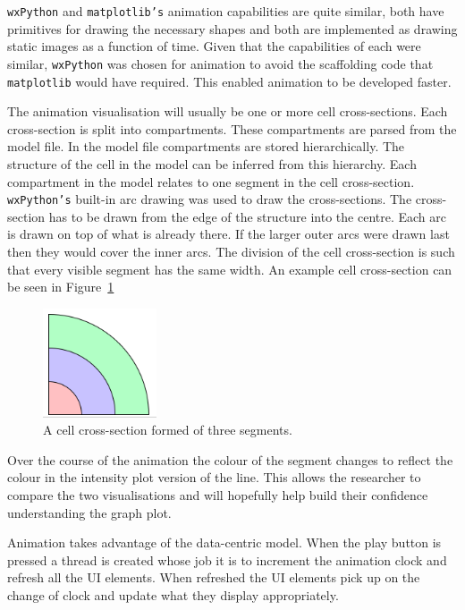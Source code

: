 \texttt{wxPython} and \texttt{matplotlib's} animation capabilities are quite similar, both have primitives for drawing the necessary shapes and both are implemented as drawing static images as a function of time.  Given that the capabilities of each were similar, \texttt{wxPython} was chosen for animation to avoid the scaffolding code that \texttt{matplotlib} would have required.  This enabled animation to be developed faster.

The animation visualisation will usually be one or more cell cross-sections.  Each cross-section is split into compartments. These compartments are parsed from the model file.  In the model file compartments are stored hierarchically.  The structure of the cell in the model can be inferred from this hierarchy.  Each compartment in the model relates to one segment in the cell cross-section.  \texttt{wxPython's} built-in arc drawing was used to draw the cross-sections.  The cross-section has to be drawn from the edge of the structure into the centre.  Each arc is drawn on top of what is already there.  If the larger outer arcs were drawn last then they would cover the inner arcs.  The division of the cell cross-section is such that every visible segment has the same width.  An example cell cross-section can be seen in Figure~\ref{fig:cell_segment}

\begin{figure}[h!]
    \centering
    \includegraphics[width=0.3\textwidth]{images/cell_segment.png}
    \caption{A cell cross-section formed of three segments.}
    \label{fig:cell_segment}
\end{figure}

Over the course of the animation the colour of the segment changes to reflect the colour in the intensity plot version of the line.  This allows the researcher to compare the two visualisations and will hopefully help build their confidence understanding the graph plot.

Animation takes advantage of the data-centric model.  When the play button is pressed a thread is created whose job it is to increment the animation clock and refresh all the \ac{UI} elements.  When refreshed the \ac{UI} elements pick up on the change of clock and update what they display appropriately.

